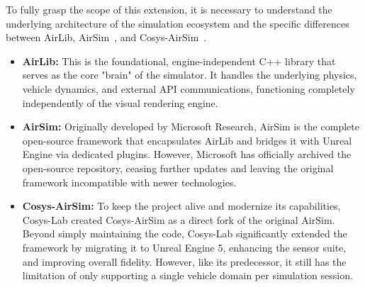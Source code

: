 To fully grasp the scope of this extension, it is necessary to understand the underlying architecture of the simulation ecosystem and the specific differences between AirLib, AirSim~\cite{airsim}, and Cosys-AirSim~\cite{jansen2023cosys}.

\begin{itemize}
    \item \textbf{AirLib:} This is the foundational, engine-independent C++ library that serves as the core "brain" of the simulator. It handles the underlying physics, vehicle dynamics, and external API communications, functioning completely independently of the visual rendering engine.
    
    \item \textbf{AirSim:} Originally developed by Microsoft Research, AirSim is the complete open-source framework that encapsulates AirLib and bridges it with Unreal Engine via dedicated plugins. However, Microsoft has officially archived the open-source repository, ceasing further updates and leaving the original framework incompatible with newer technologies.
    
    \item \textbf{Cosys-AirSim:} To keep the project alive and modernize its capabilities, Cosys-Lab created Cosys-AirSim as a direct fork of the original AirSim. Beyond simply maintaining the code, Cosys-Lab significantly extended the framework by migrating it to Unreal Engine 5, enhancing the sensor suite, and improving overall fidelity. However, like its predecessor, it still has the limitation of only supporting a single vehicle domain per simulation session.
\end{itemize}